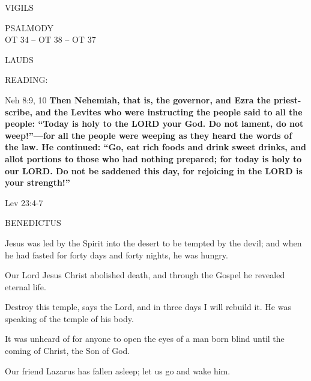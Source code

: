 \begin{flushleft}\normalsize{\uppercase{VIGILS\\}}\end{flushleft}
\noindent\small{\uppercase{PSALMODY}\\}
\uppercase{OT 34 -- OT 38 -- OT 37}\vspace{0.5em}

\begin{flushleft}\normalsize{\uppercase{LAUDS\\}}\end{flushleft}
\noindent READING:
\begin{description}[labelindent=\parindent, leftmargin=*]
\item [Weeks 1-4:]    Neh 8:9, 10   \textbf{Then Nehemiah, that is, the governor, and Ezra the priest-scribe, and the Levites who were instructing the people said to all the people: “Today is holy to the LORD your God. Do not lament, do not weep!”—for all the people were weeping as they heard the words of the law. He continued: “Go, eat rich foods and drink sweet drinks, and allot portions to those who had nothing prepared; for today is holy to our LORD. Do not be saddened this day, for rejoicing in the LORD is your strength!”\\} 
\item [Week 5:]  Lev 23:4-7  
\end{description}

\noindent BENEDICTUS
\begin{description}[labelindent=\parindent, leftmargin=*]
\item [Week 1:]	Jesus was led by the Spirit into the desert to be tempted by the devil; and when he had fasted for forty days and forty nights, he was hungry.
\item [Week 2:]	Our Lord Jesus Christ abolished death, and through the Gospel he revealed eternal life.
\item [Week 3:]	Destroy this temple, says the Lord, and in three days I will rebuild it. He was speaking of the temple of his body.
\item [Week 4:]	It was unheard of for anyone to open the eyes of a man born blind until the coming of Christ, the Son of God.
\item [Week 5:]	Our friend Lazarus has fallen asleep; let us go and wake him.
\end{description}

